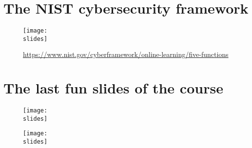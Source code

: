 \section{The NIST cybersecurity framework}
\begin{figure}[H]
  \centering
  \texttt{[image: \\slides]}
  \caption[short]{
    \href{https://www.nist.gov/cyberframework/online-learning/five-functions}{https://www.nist.gov/cyberframework/online-learning/five-functions} }
\end{figure}

\section{The last fun slides of the course}
\begin{figure}[h]
  \centering
  \texttt{[image: \\slides]}
\end{figure}
\begin{figure}[h]
  \centering
  \texttt{[image: \\slides]}
\end{figure}
